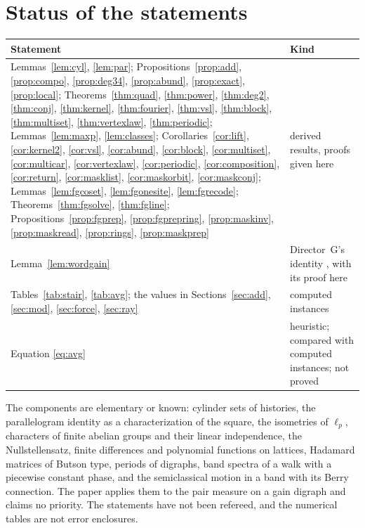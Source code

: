 \section{Status of the statements}

\begin{center}\small
\begin{tabular}{@{}p{}p{}@{}}\toprule
Statement & Kind\\\midrule
Lemmas~\ref{lem:cyl}, \ref{lem:par}; Propositions~\ref{prop:add}, \ref{prop:compo}, \ref{prop:deg34}, \ref{prop:abund}, \ref{prop:exact}, \ref{prop:local}; Theorems~\ref{thm:quad}, \ref{thm:power}, \ref{thm:deg2}, \ref{thm:conj}, \ref{thm:kernel}, \ref{thm:fourier}, \ref{thm:vsl}, \ref{thm:block}, \ref{thm:multiset}, \ref{thm:vertexlaw}, \ref{thm:periodic}; Lemmas~\ref{lem:maxp}, \ref{lem:classes}; Corollaries~\ref{cor:lift}, \ref{cor:kernel2}, \ref{cor:vsl}, \ref{cor:abund}, \ref{cor:block}, \ref{cor:multiset}, \ref{cor:multicar}, \ref{cor:vertexlaw}, \ref{cor:periodic}, \ref{cor:composition}, \ref{cor:return}, \ref{cor:masklist}, \ref{cor:maskorbit}, \ref{cor:maskconj}; Lemmas~\ref{lem:fgcoset}, \ref{lem:fgonesite}, \ref{lem:fgrecode}; Theorems~\ref{thm:fgsolve}, \ref{thm:fgline}; Propositions~\ref{prop:fgprep}, \ref{prop:fgprepring}, \ref{prop:maskinv}, \ref{prop:maskread}, \ref{prop:rings}, \ref{prop:maskprep} & derived results, proofs given here\\
Lemma~\ref{lem:wordgain} & Director~G's identity \cite{dgfour}, with its proof here\\
Tables~\ref{tab:stair}, \ref{tab:avg}; the values in Sections~\ref{sec:add}, \ref{sec:mod}, \ref{sec:force}, \ref{sec:ray} & computed instances\\
Equation \eqref{eq:avg} & heuristic; compared with computed instances; not proved\\\bottomrule
\end{tabular}
\end{center}

The components are elementary or known: cylinder sets of histories, the parallelogram identity as a characterization of the square, the isometries of $\ell_p$, characters of finite abelian groups and their linear independence, the Nullstellensatz, finite differences and polynomial functions on lattices, Hadamard matrices of Butson type, periods of digraphs, band spectra of a walk with a piecewise constant phase, and the semiclassical motion in a band with its Berry connection. The paper applies them to the pair measure on a gain digraph and claims no priority. The statements have not been refereed, and the numerical tables are not error enclosures.
